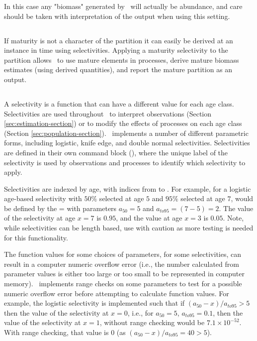 In this case any "biomass" generated by \CNAME\ will actually be abundance, and care should be taken with interpretation of the output when using this setting.

\subsection{\label{sec:maturity-notinpartition}}

If maturity is not a character of the partition it can easily be derived at an instance in time using selectivities. Applying a maturity selectivity to the partition allows \CNAME\ to use mature elements in processes, derive mature biomass estimates (using derived quantities), and report the mature partition as an output.

\subsection{\label{sec:selectivities}}

A selectivity is a function that can have a different value for each age class. Selectivities are used throughout \CNAME\ to interpret observations (Section \ref{sec:estimation-section}) or to modify the effects of processes on each age class (Section \ref{sec:population-section}). \CNAME\ implements a number of different parametric forms, including logistic, knife edge, and double normal selectivities. Selectivities are defined in their own command block (), where the unique label of the selectivity is used by observations and processes to identify which selectivity to apply.

Selectivities are indexed by age, with indices from  to . For example, for a logistic age-based selectivity with $50\%$ selected at age $5$ and $95\%$ selected at age $7$, would be defined by the = with parameters $a_{50}=5$ and $a_{to95}=(7-5)=2$. The value of the selectivity at age $x=7$ is $0.95$, and the value at age $x=3$ is $0.05$. Note, while selectivities can be length based, use with caution as more testing is needed for this functionality.

The function values for some choices of parameters, for some selectivities, can result in a computer numeric overflow error (i.e., the number calculated from parameter values is either too large or too small to be represented in computer memory). \CNAME\ implements range checks on some parameters to test for a possible numeric overflow error before attempting to calculate function values. For example, the logistic selectivity is implemented such that if $(a_{50}-x)/a_{to95} > 5$ then the value of the selectivity at $x=0$, i.e., for $a_{50}=5$, $a_{to95}=0.1$, then the value of the selectivity at $x=1$, without range checking would be $7.1 \times 10^{-52}$. With range checking, that value is $0$ (as $(a_{50}-x)/a_{to95}=40 > 5$).

